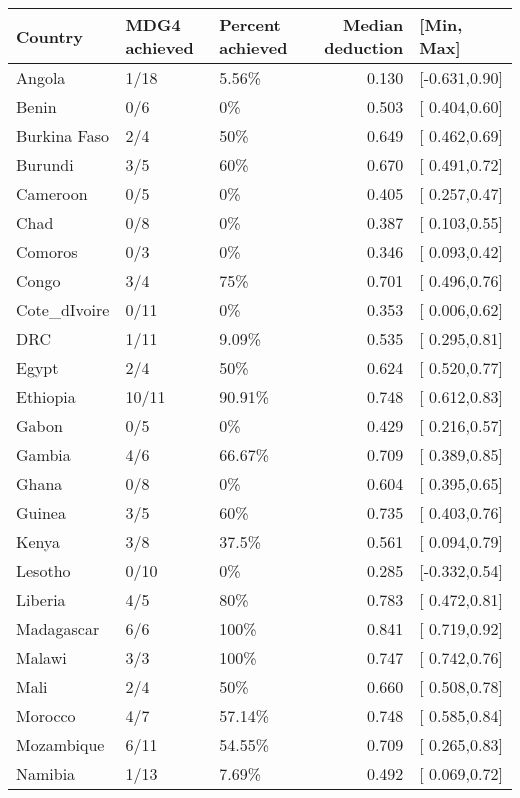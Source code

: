 \begin{table}[ht]
\centering
\begin{tabular}{lllrl}
  \hline
Country & MDG4 achieved & Percent achieved & Median deduction & [Min, Max] \\ 
  \hline
Angola & 1/18 & 5.56\% & 0.130 & [-0.631,0.90] \\ 
  Benin & 0/6 & 0\% & 0.503 & [ 0.404,0.60] \\ 
  Burkina Faso & 2/4 & 50\% & 0.649 & [ 0.462,0.69] \\ 
  Burundi & 3/5 & 60\% & 0.670 & [ 0.491,0.72] \\ 
  Cameroon & 0/5 & 0\% & 0.405 & [ 0.257,0.47] \\ 
  Chad & 0/8 & 0\% & 0.387 & [ 0.103,0.55] \\ 
  Comoros & 0/3 & 0\% & 0.346 & [ 0.093,0.42] \\ 
  Congo & 3/4 & 75\% & 0.701 & [ 0.496,0.76] \\ 
  Cote\_dIvoire & 0/11 & 0\% & 0.353 & [ 0.006,0.62] \\ 
  DRC & 1/11 & 9.09\% & 0.535 & [ 0.295,0.81] \\ 
  Egypt & 2/4 & 50\% & 0.624 & [ 0.520,0.77] \\ 
  Ethiopia & 10/11 & 90.91\% & 0.748 & [ 0.612,0.83] \\ 
  Gabon & 0/5 & 0\% & 0.429 & [ 0.216,0.57] \\ 
  Gambia & 4/6 & 66.67\% & 0.709 & [ 0.389,0.85] \\ 
  Ghana & 0/8 & 0\% & 0.604 & [ 0.395,0.65] \\ 
  Guinea & 3/5 & 60\% & 0.735 & [ 0.403,0.76] \\ 
  Kenya & 3/8 & 37.5\% & 0.561 & [ 0.094,0.79] \\ 
  Lesotho & 0/10 & 0\% & 0.285 & [-0.332,0.54] \\ 
  Liberia & 4/5 & 80\% & 0.783 & [ 0.472,0.81] \\ 
  Madagascar & 6/6 & 100\% & 0.841 & [ 0.719,0.92] \\ 
  Malawi & 3/3 & 100\% & 0.747 & [ 0.742,0.76] \\ 
  Mali & 2/4 & 50\% & 0.660 & [ 0.508,0.78] \\ 
  Morocco & 4/7 & 57.14\% & 0.748 & [ 0.585,0.84] \\ 
  Mozambique & 6/11 & 54.55\% & 0.709 & [ 0.265,0.83] \\ 
  Namibia & 1/13 & 7.69\% & 0.492 & [ 0.069,0.72] \\ 

\end{tabular}
\end{table}
